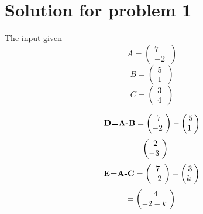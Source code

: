 \documentclass[10pt, a4paper]{article}
\begin{document}
\section{Solution for problem 1}
\begin{center}
The input given 
\boldmath
\begin{equation} \label{eq:}
A=\begin{pmatrix} 7\\ -2\ \end{pmatrix} 
\end{equation}
\begin{equation}\label{eq:}
B=\begin{pmatrix} 5\\ 1\ \end{pmatrix}
\end{equation}
\begin{equation}\label{eq:}
C=\begin{pmatrix} 3\\ 4\ \end{pmatrix}
\end{equation}
\unboldmath
\end{center}
\begin{equation}\label{eq:}
\textbf{D=A-B}\\
=\begin{pmatrix} 7\\ -2\ \end{pmatrix}- \begin{pmatrix} 5\\ 1\ \end{pmatrix}
\end{equation}
\begin{equation}\label{eq:}
=\begin{pmatrix} 2\\ -3\ \end{pmatrix}\\
\end{equation}
\begin{equation}\label{eq:}
\textbf{E=A-C}\\
=\begin{pmatrix} 7\\ -2\ \end{pmatrix}- \begin{pmatrix} 3\\ k\ \end{pmatrix}
\end{equation}
\begin{equation}\label{eq:}
=\begin{pmatrix} 4\\ -2-k\ \end{pmatrix}\\
\end{equation}
\end{document}
